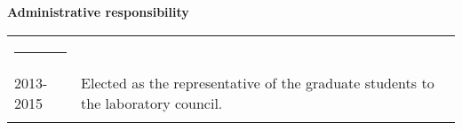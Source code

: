 \documentclass[a4paper,oneside]{article}
\newcommand{\ligne}[1]{\rule[0.5ex]{\textwidth}{#1}\\}
\newcommand{\interRubrique}{\bigskip}
\newcommand{\styleRub}[1]{\noindent\textbf{\large #1}\par}
\newcommand{\indentStd}{\noindent\hspace{\lenA}}
\newenvironment{rubrique}[2][\linewidth] {
    \styleRub{#2}
    \setlength{\lenB}{#1}
    \setlength{\lenC}{\linewidth}
    \addtolength{\lenC}{-\lenA}
    \addtolength{\lenC}{-\lenB}
    \addtolength{\lenC}{-\parindent}
    \addtolength{\lenC}{-9pt}
    \indentStd\begin{tabular}[t]{p{\lenB}p{\lenC}}
}
{\end{tabular}}
\begin{document}
\interRubrique

\begin{rubrique}[3.4cm]{Administrative responsibility}
    \ligne{0.1mm}
2013-2015
& Elected as the representative of the graduate students to the laboratory council. \\ \\

\end{rubrique}

\interRubrique


\end{document}

